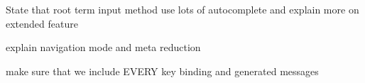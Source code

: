 \documentclass[master.tex]{subfiles}
\begin{document}
State that root term input method use lots of autocomplete and explain more on
extended feature

explain navigation mode and meta reduction

make sure that we include EVERY key binding and generated messages












\end{document}
